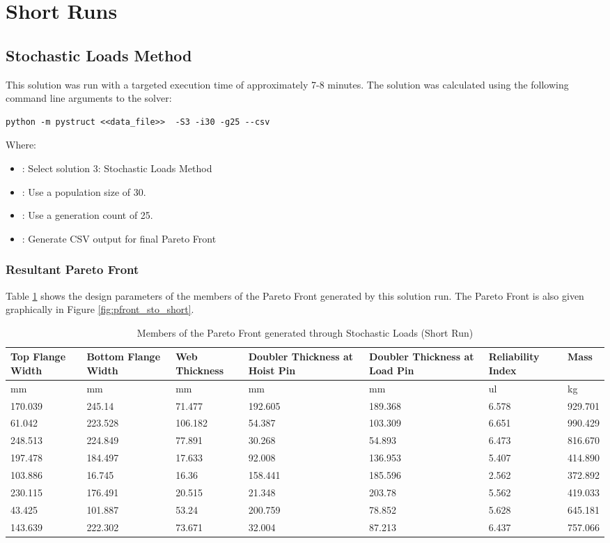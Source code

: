 \section{Short Runs}

\subsection{Stochastic Loads Method}
This solution was run with a targeted execution time of approximately 7-8 minutes. The solution was calculated using the following command line arguments to the solver: 

\begin{verbatim}
python -m pystruct <<data_file>>  -S3 -i30 -g25 --csv
\end{verbatim}

\noindent Where: 

\begin{itemize}
  \item {}: Select solution 3: Stochastic Loads Method
  \item {}: Use a population size of 30. 
  \item {}: Use a generation count of 25. 
  \item {}: Generate CSV output for final Pareto Front
\end{itemize}


\subsubsection{Resultant Pareto Front}
Table \ref{tab:pfront_sto_short} shows the design parameters of the members of the Pareto Front generated by this solution run. The Pareto Front is also given graphically in Figure \ref{fig:pfront_sto_short}. 

\begin{table}[!htbp]
\centering
\small
\begin{tabular}{|p{1.5cm}p{1.5cm}p{1.4cm}p{2cm}p{2cm}p{1.5cm}p{1.5cm}|}
\hline
Top Flange Width&Bottom Flange Width&Web Thickness&Doubler Thickness at Hoist Pin&Doubler Thickness at Load Pin&Reliability Index& Mass\\
\hline
mm&mm&mm&mm&mm&ul&kg\\
\hline
170.039&245.14&71.477&192.605&189.368&6.578&929.701\\
61.042&223.528&106.182&54.387&103.309&6.651&990.429\\
248.513&224.849&77.891&30.268&54.893&6.473&816.670\\
197.478&184.497&17.633&92.008&136.953&5.407&414.890\\
103.886&16.745&16.36&158.441&185.596&2.562&372.892\\
230.115&176.491&20.515&21.348&203.78&5.562&419.033\\
43.425&101.887&53.24&200.759&78.852&5.628&645.181\\
143.639&222.302&73.671&32.004&87.213&6.437&757.066\\
\hline
\end{tabular}
	\caption{Members of the Pareto Front generated through Stochastic Loads (Short Run)}
\label{tab:pfront_sto_short}
\end{table}

